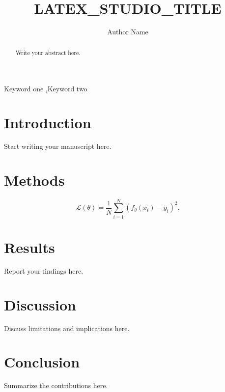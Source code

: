 \documentclass[preprint,12pt]{elsarticle}
\begin{document}
\begin{frontmatter}
\title{LATEX_STUDIO_TITLE}
\author{Author Name}
\begin{abstract}
Write your abstract here.
\end{abstract}
\begin{keyword}
Keyword one \sep Keyword two
\end{keyword}
\end{frontmatter}

\section{Introduction}
Start writing your manuscript here.

\section{Methods}
\begin{equation}
  \mathcal{L}(\theta) = \frac{1}{N}\sum_{i=1}^{N}(f_\theta(x_i)-y_i)^2.
  \label{eq:objective}
\end{equation}

\section{Results}
Report your findings here.

\section{Discussion}
Discuss limitations and implications here.

\section{Conclusion}
Summarize the contributions here.

% 
% 
\end{document}
